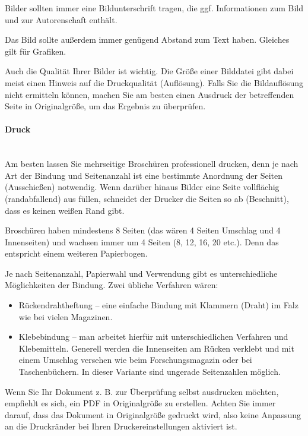 \documentclass[parskip=on, twoside]{scrartcl}
\begin{document}
Bilder sollten immer eine Bildunterschrift tragen, die ggf. Informationen zum
Bild und zur Autorenschaft enthält.\par

Das Bild sollte außerdem immer genügend Abstand zum Text haben. Gleiches gilt
für Grafiken.\par
{}

Auch die Qualität Ihrer Bilder ist wichtig. Die Größe einer Bilddatei gibt
dabei meist einen Hinweis auf die Druckqualität (Auflösung). Falls Sie die
Bildauflösung nicht ermitteln können, machen Sie am besten einen Ausdruck der
betreffenden Seite in Originalgröße, um das Ergebnis zu überprüfen.

\paragraph{Druck}\strut\\
Am besten lassen Sie mehrseitige Broschüren professionell drucken, denn je
nach Art der Bindung und Seitenanzahl ist eine bestimmte Anordnung der Seiten
(Ausschießen) notwendig. Wenn darüber hinaus Bilder eine Seite vollflächig
(randabfallend) aus füllen, schneidet der Drucker die Seiten so ab
(Beschnitt), dass es keinen weißen Rand gibt.\par

Broschüren haben mindestens 8 Seiten (das wären 4 Seiten Umschlag und 4
Innenseiten) und wachsen immer um 4 Seiten (8, 12, 16, 20 etc.). Denn das
entspricht einem weiteren Papierbogen.\par

Je nach Seitenanzahl, Papierwahl und Verwendung gibt es unterschiedliche
Möglichkeiten der Bindung. Zwei übliche Verfahren wären:
\begin{itemize}
  \item Rückendrahtheftung – eine einfache Bindung mit Klammern
    (Draht) im Falz wie bei vielen Magazinen.
  \item Klebebindung – man arbeitet hierfür mit unterschiedlichen Verfahren
    und Klebemitteln. Generell werden die Innenseiten am Rücken verklebt und
    mit einem Umschlag versehen wie beim Forschungsmagazin oder bei
    Taschenbüchern. In dieser Variante sind ungerade Seitenzahlen möglich.
\end{itemize}
Wenn Sie Ihr Dokument z. B. zur Überprüfung selbst ausdrucken möchten,
empfiehlt es sich, ein PDF in Originalgröße zu erstellen. Achten Sie immer
darauf, dass das Dokument in Originalgröße gedruckt wird, also keine Anpassung
an die Druckränder bei Ihren Druckereinstellungen aktiviert ist.\par
\end{document}
